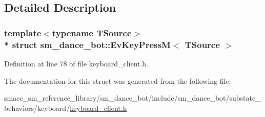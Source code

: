 \subsection{Detailed Description}
\subsubsection*{template$<$typename T\+Source$>$\\*
struct sm\+\_\+dance\+\_\+bot\+::\+Ev\+Key\+Press\+M$<$ T\+Source $>$}



Definition at line 78 of file keyboard\+\_\+client.\+h.



The documentation for this struct was generated from the following file\+:\begin{DoxyCompactItemize}
\item 
smacc\+\_\+sm\+\_\+reference\+\_\+library/sm\+\_\+dance\+\_\+bot/include/sm\+\_\+dance\+\_\+bot/substate\+\_\+behaviors/keyboard/\hyperlink{keyboard__client_8h}{keyboard\+\_\+client.\+h}\end{DoxyCompactItemize}
